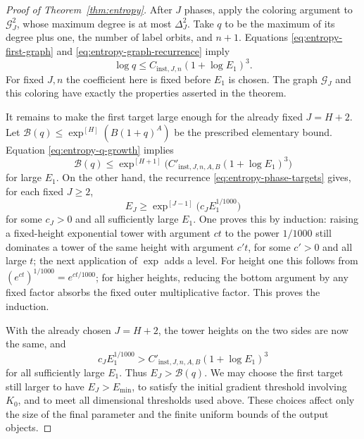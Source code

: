 \begin{proof}[Proof of Theorem~\ref{thm:entropy}]
After \(J\) phases, apply the coloring argument to
\(\mathcal G_J^2\), whose maximum degree is at most \(\Delta_J^2\).
Take \(q\) to be the maximum of its degree plus one, the number of
label orbits, and \(n+1\).  Equations \eqref{eq:entropy-first-graph} and
\eqref{eq:entropy-graph-recurrence} imply
\begin{equation}\label{eq:entropy-q-growth}
 \log q\leq C_{\mathrm{inst},J,n}(1+\log E_1)^3.
\end{equation}
For fixed \(J,n\) the coefficient here is fixed before \(E_1\) is
chosen.  The graph \(\mathcal G_J\) and this coloring have exactly
the properties asserted in the theorem.

It remains to make the first target large enough for the already fixed
\(J=H+2\).  Let
\(\mathcal B(q)\leq\exp^{[H]}(B(1+q)^A)\) be the prescribed
elementary bound.  Equation \eqref{eq:entropy-q-growth} implies
\[
 \mathcal B(q)\leq
 \exp^{[H+1]}\bigl(C'_{\mathrm{inst},J,n,A,B}
                         (1+\log E_1)^3\bigr)
\]
for large \(E_1\).  On the other hand, the recurrence
\eqref{eq:entropy-phase-targets} gives, for each fixed \(J\geq2\),
\begin{equation}\label{eq:entropy-tower-growth}
 E_J\geq\exp^{[J-1]}\bigl(c_J E_1^{1/1000}\bigr)
\end{equation}
for some \(c_J>0\) and all sufficiently large \(E_1\).
One proves this by induction: raising a fixed-height exponential
tower with argument \(c t\) to the power \(1/1000\) still dominates
a tower of the same height with argument \(c't\), for some \(c'>0\)
and all large \(t\); the next application of \(\exp\) adds a level.
For height one this follows from
\((e^{ct})^{1/1000}=e^{ct/1000}\); for higher heights, reducing the
bottom argument by any fixed factor absorbs the fixed outer
multiplicative factor.  This proves the induction.

With the already chosen \(J=H+2\), the tower heights on the
two sides are now the same, and
\[
 c_J E_1^{1/1000}>
 C'_{\mathrm{inst},J,n,A,B}(1+\log E_1)^3
\]
for all sufficiently large \(E_1\).  Thus \(E_J>\mathcal B(q)\).
We may choose the first target still larger to have
\(E_J>E_{\min}\), to satisfy the initial gradient threshold involving
\(K_0\), and to meet all dimensional thresholds used above.
These choices affect only the size of the final parameter and the
finite uniform bounds of the output objects.


\end{proof}
